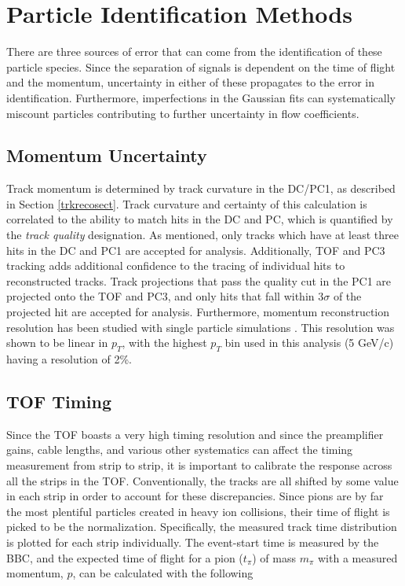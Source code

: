 \section{Particle Identification Methods}
\label{sectpiderr}
There are three sources of error that can come from the identification of these particle species. Since the separation of signals is dependent on the time of flight and the momentum, uncertainty in either of these propagates to the error in identification. Furthermore, imperfections in the Gaussian fits can systematically miscount particles contributing to further uncertainty in flow coefficients.

\subsection{Momentum Uncertainty}
Track momentum is determined by track curvature in the DC/PC1, as described in Section \ref{trkrecosect}. Track curvature and certainty of this calculation is correlated to the ability to match hits in the DC and PC, which is quantified by the \textit{track quality} designation. As mentioned, only tracks which have at least three hits in the DC and PC1 are accepted for analysis. Additionally, TOF and PC3 tracking adds additional confidence to the tracing of individual hits to reconstructed tracks. Track projections that pass the quality cut in the PC1 are projected onto the TOF and PC3, and only hits that fall within $3\sigma$ of the projected hit are accepted for analysis. Furthermore, momentum reconstruction resolution has been studied with single particle simulations \citep{Mitchell:2002wu}. This resolution was shown to be linear in $p_T$, with the highest $p_T$ bin used in this analysis (5 GeV/c) having a resolution of 2\%.
 
\subsection{TOF Timing}
Since the TOF boasts a very high timing resolution and since the preamplifier gains, cable lengths, and various other systematics can affect the timing measurement from strip to strip, it is important to calibrate the response across all the strips in the TOF. Conventionally, the tracks are all shifted by some value in each strip in order to account for these discrepancies. Since pions are by far the most plentiful particles created in heavy ion collisions, their time of flight is picked to be the normalization. Specifically, the measured track time distribution is plotted for each strip individually. The event-start time is measured by the BBC, and the expected time of flight for a pion ($t_{\pi}$) of mass $m_{\pi}$ with a measured momentum, $p$, can be calculated with the following

